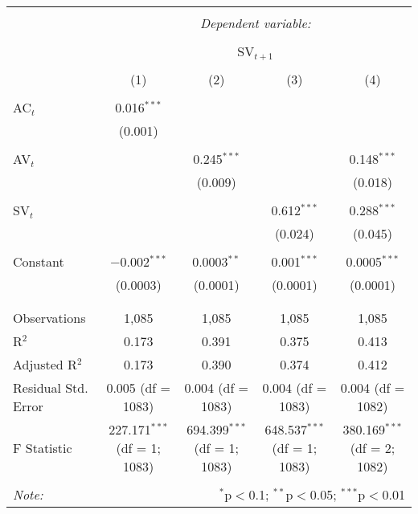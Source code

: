
\begin{table}[!htbp] \centering 
  \caption{} 
  \label{} 
\begin{tabular}{@{\extracolsep{5pt}}lcccc} 
\\[-1.8ex]\hline 
\hline \\[-1.8ex] 
 & \multicolumn{4}{c}{\textit{Dependent variable:}} \\ 
\cline{2-5} 
\\[-1.8ex] & \multicolumn{4}{c}{SV$_{t+1}$} \\ 
\\[-1.8ex] & (1) & (2) & (3) & (4)\\ 
\hline \\[-1.8ex] 
 AC$_{t}$ & 0.016$^{***}$ &  &  &  \\ 
  & (0.001) &  &  &  \\ 
  & & & & \\ 
 AV$_{t}$ &  & 0.245$^{***}$ &  & 0.148$^{***}$ \\ 
  &  & (0.009) &  & (0.018) \\ 
  & & & & \\ 
 SV$_{t}$ &  &  & 0.612$^{***}$ & 0.288$^{***}$ \\ 
  &  &  & (0.024) & (0.045) \\ 
  & & & & \\ 
 Constant & $-$0.002$^{***}$ & 0.0003$^{**}$ & 0.001$^{***}$ & 0.0005$^{***}$ \\ 
  & (0.0003) & (0.0001) & (0.0001) & (0.0001) \\ 
  & & & & \\ 
\hline \\[-1.8ex] 
Observations & 1,085 & 1,085 & 1,085 & 1,085 \\ 
R$^{2}$ & 0.173 & 0.391 & 0.375 & 0.413 \\ 
Adjusted R$^{2}$ & 0.173 & 0.390 & 0.374 & 0.412 \\ 
Residual Std. Error & 0.005 (df = 1083) & 0.004 (df = 1083) & 0.004 (df = 1083) & 0.004 (df = 1082) \\ 
F Statistic & 227.171$^{***}$ (df = 1; 1083) & 694.399$^{***}$ (df = 1; 1083) & 648.537$^{***}$ (df = 1; 1083) & 380.169$^{***}$ (df = 2; 1082) \\ 
\hline 
\hline \\[-1.8ex] 
\textit{Note:}  & \multicolumn{4}{r}{$^{*}$p$<$0.1; $^{**}$p$<$0.05; $^{***}$p$<$0.01} \\ 
\end{tabular} 
\end{table} 
